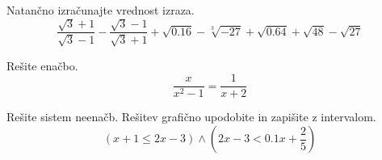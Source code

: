 \documentclass[addpoints]{exam}
\begin{document}
\begin{questions}


    \question
    Natančno izračunajte vrednost izraza.
    $$\dfrac{\sqrt{3}+1}{\sqrt{3}-1}-\dfrac{\sqrt{3}-1}{\sqrt{3}+1}+\sqrt{0.16}-\sqrt[3]{-27}+\sqrt{0.64}+\sqrt{48}-\sqrt{27}$$

    
    
    \question
    Rešite enačbo.
        $$ \dfrac{x}{x^2-1}=\dfrac{1}{x+2}$$
    
    





    \question
    Rešite sistem neenačb. Rešitev grafično upodobite in zapišite z intervalom.
    $$(x+1\leq 2x-3)\land(2x-3<0.1x+\frac{2}{5})$$
    





\end{questions}
\end{document}
